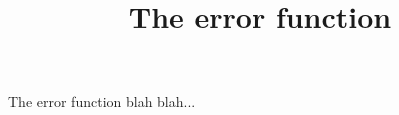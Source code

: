 \documentclass[twocolumn]{article}
\begin{document}
\title{The error function}
\maketitle


The error function blah blah...

\begin{figure}
\end{figure}
\end{document}
